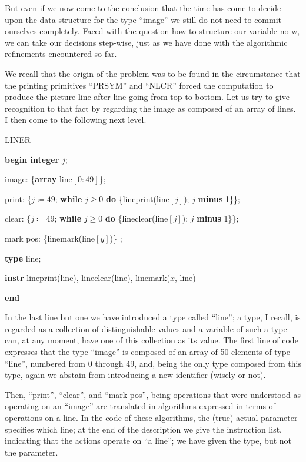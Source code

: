 But even if we now come to the conclusion that the time has come to decide upon the data structure for the type ``image'' we still do not need to commit ourselves completely. Faced with the question how to structure our variable no w, we can take our decisions step-wise, just as we have done with the algorithmic refinements encountered so far.

We recall that the origin of the problem was to be found in the circumstance that the printing primitives ``PRSYM'' and ``NLCR'' forced the computation to produce the picture line after line going from top to bottom. Let us try to give recognition to that fact by regarding the image as composed of an array of lines. I then come to the following next level.

LINER

\textbf{begin integer} $j$;

\quad image: \{\textbf{array} line$[0: 49]$\};

\quad print: \{$j \coloneq 49$; \textbf{while} $j \geqslant 0$ \textbf{do} \{lineprint(line$[j]$); $j$ \textbf{minus} 1\}\};

\quad clear: \{$j \coloneq 49$; \textbf{while} $j \geqslant 0$ \textbf{do} \{lineclear(line$[j]$); $j$ \textbf{minus} 1\}\};

\quad mark pos: \{linemark(line$[y]$)\} ;

\quad \textbf{type} line;

\quad \textbf{instr} lineprint(line), lineclear(line), linemark($x$, line)

\textbf{end}

In the last line but one we have introduced a type called ``line''; a type, I recall, is regarded as a collection of distinguishable values and a variable of such a type can, at any moment, have one of this collection as its value. The first line of code expresses that the type ``image'' is composed of an array of 50 elements of type ``line'', numbered from 0 through 49, and, being the only type composed from this type, again we abstain from introducing a new identifier (wisely or not).

Then, ``print'', ``clear'', and ``mark pos'', being operations that were understood as operating on an ``image'' are translated in algorithms expressed in terms of operations on a line. In the code of these algorithms, the (true) actual parameter specifies which line; at the end of the description we give the instruction list, indicating that the actions operate on ``a line''; we have given the type, but not the parameter.

